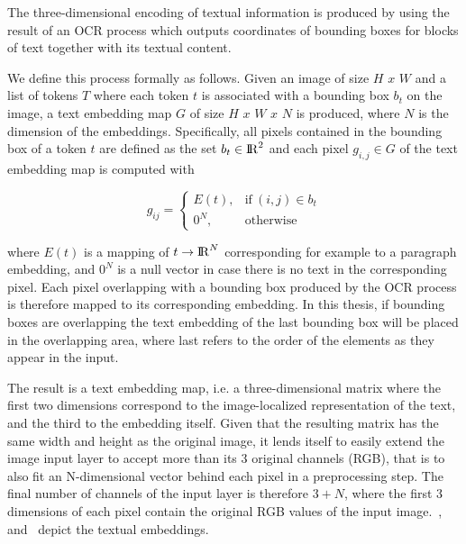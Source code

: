 \documentclass[oneside, english, bibtex]{kththesis}
\begin{document}
The three-dimensional encoding of textual information is produced by using the result of an OCR process which outputs coordinates of bounding boxes for blocks of text together with its textual content.

We define this process formally as follows. Given an image of size $H$ $x$ $W$ and a list of tokens $T$ where each token $t$ is associated with a bounding box $b_t$ on the image, a text embedding map $G$ of size $H$ $x$ $W$ $x$ $N$ is produced, where $N$ is the dimension of the embeddings. Specifically, all pixels contained in the bounding box of a token $t$ are defined as the set $b_t \in {\rm I\!R}^2$ and each pixel $g_{i,j} \in G$ of the text embedding map is computed with

\begin{equation}
	g_{ij} =
	    \begin{cases}
	      E(t), & \text{if}\ (i,j) \in b_t \\
	      0^N, & \text{otherwise}
	    \end{cases}
  	\label{eqn:textembedding}
\end{equation}

where $E(t)$ is a mapping of $t \rightarrow {\rm I\!R}^N$ corresponding for example to a paragraph embedding, and $0^N$ is a null vector in case there is no text in the corresponding pixel. Each pixel overlapping with a bounding box produced by the OCR process is therefore mapped to its corresponding embedding. In this thesis, if bounding boxes are overlapping the text embedding of the last bounding box will be placed in the overlapping area, where last refers to the order of the elements as they appear in the input. 

The result is a text embedding map, i.e. a three-dimensional matrix where the first two dimensions correspond to the image-localized representation of the text, and the third to the embedding itself. Given that the resulting matrix has the same width and height as the original image, it lends itself to easily extend the image input layer to accept more than its 3 original channels (RGB), that is to also fit an N-dimensional vector behind each pixel in a preprocessing step. The final number of channels of the input layer is therefore $3+N$, where the first 3 dimensions of each pixel contain the original RGB values of the input image.~,~ and~ depict the textual embeddings. 


\clearpage 
\end{document}
